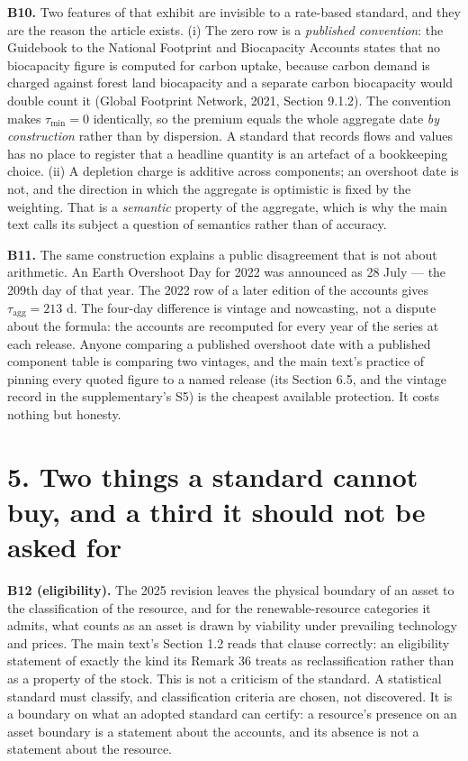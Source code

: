 \documentclass[11pt]{article}
\begin{document}
\textbf{B10.} Two features of that exhibit are invisible to a rate-based standard, and they are the reason the article exists. (i) The zero row is a \emph{published convention}: the Guidebook to the National Footprint and Biocapacity Accounts states that no biocapacity figure is computed for carbon uptake, because carbon demand is charged against forest land biocapacity and a separate carbon biocapacity would double count it (Global Footprint Network, 2021, Section 9.1.2). The convention makes \(\tau_{\min}=0\) identically, so the premium equals the whole aggregate date \emph{by construction} rather than by dispersion. A standard that records flows and values has no place to register that a headline quantity is an artefact of a bookkeeping choice. (ii) A depletion charge is additive across components; an overshoot date is not, and the direction in which the aggregate is optimistic is fixed by the weighting. That is a \emph{semantic} property of the aggregate, which is why the main text calls its subject a question of semantics rather than of accuracy.

\textbf{B11.} The same construction explains a public disagreement that is not about arithmetic. An Earth Overshoot Day for 2022 was announced as 28 July --- the 209th day of that year. The 2022 row of a later edition of the accounts gives \(\tau_{\mathrm{agg}} = 213\) d. The four-day difference is vintage and nowcasting, not a dispute about the formula: the accounts are recomputed for every year of the series at each release. Anyone comparing a published overshoot date with a published component table is comparing two vintages, and the main text's practice of pinning every quoted figure to a named release (its Section 6.5, and the vintage record in the supplementary's S5) is the cheapest available protection. It costs nothing but honesty.

\vspace{0.8em}

\section*{5. Two things a standard cannot buy, and a third it should not be asked for}\label{5-two-things-a-standard-cannot-buy-and-a-third-it-should-not-be-asked-}

\textbf{B12 (eligibility).} The 2025 revision leaves the physical boundary of an asset to the classification of the resource, and for the renewable-resource categories it admits, what counts as an asset is drawn by viability under prevailing technology and prices. The main text's Section 1.2 reads that clause correctly: an eligibility statement of exactly the kind its Remark 36 treats as reclassification rather than as a property of the stock. This is not a criticism of the standard. A statistical standard must classify, and classification criteria are chosen, not discovered. It is a boundary on what an adopted standard can certify: a resource's presence on an asset boundary is a statement about the accounts, and its absence is not a statement about the resource.
\end{document}
